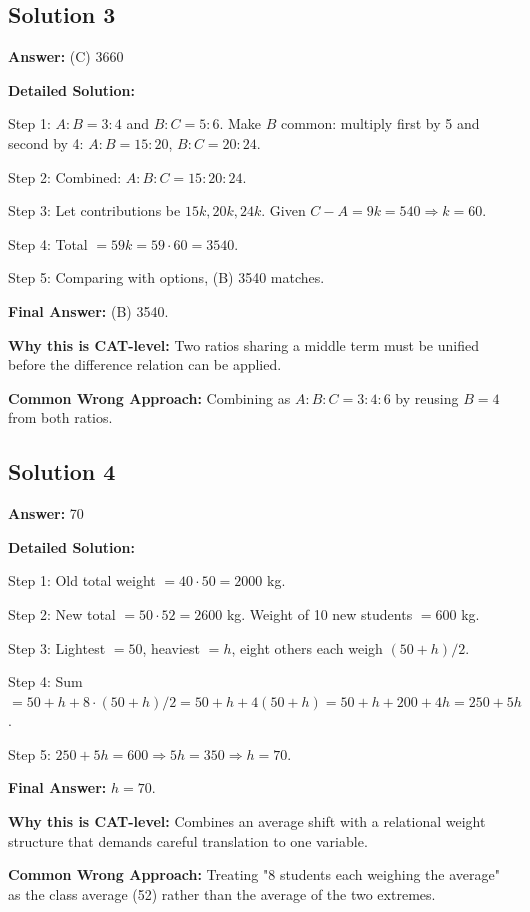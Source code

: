 \documentclass[11pt]{article}
\begin{document}
\subsection*{Solution 3}
\textbf{Answer:} (C) 3660

\textbf{Detailed Solution:}

Step 1: $A:B = 3:4$ and $B:C = 5:6$. Make $B$ common: multiply first by 5 and second by 4: $A:B = 15:20$, $B:C = 20:24$.

Step 2: Combined: $A:B:C = 15:20:24$.

Step 3: Let contributions be $15k, 20k, 24k$. Given $C - A = 9k = 540 \Rightarrow k = 60$.

Step 4: Total $= 59k = 59 \cdot 60 = 3540$.

Step 5: Comparing with options, (B) 3540 matches.

\textbf{Final Answer:} (B) 3540.

\textbf{Why this is CAT-level:} Two ratios sharing a middle term must be unified before the difference relation can be applied.

\textbf{Common Wrong Approach:} Combining as $A:B:C = 3:4:6$ by reusing $B = 4$ from both ratios.

\subsection*{Solution 4}
\textbf{Answer:} 70

\textbf{Detailed Solution:}

Step 1: Old total weight $= 40 \cdot 50 = 2000$ kg.

Step 2: New total $= 50 \cdot 52 = 2600$ kg. Weight of 10 new students $= 600$ kg.

Step 3: Lightest $= 50$, heaviest $= h$, eight others each weigh $(50 + h)/2$.

Step 4: Sum $= 50 + h + 8 \cdot (50 + h)/2 = 50 + h + 4(50 + h) = 50 + h + 200 + 4h = 250 + 5h$.

Step 5: $250 + 5h = 600 \Rightarrow 5h = 350 \Rightarrow h = 70$.

\textbf{Final Answer:} $h = 70$.

\textbf{Why this is CAT-level:} Combines an average shift with a relational weight structure that demands careful translation to one variable.

\textbf{Common Wrong Approach:} Treating "8 students each weighing the average" as the class average (52) rather than the average of the two extremes.
\end{document}
